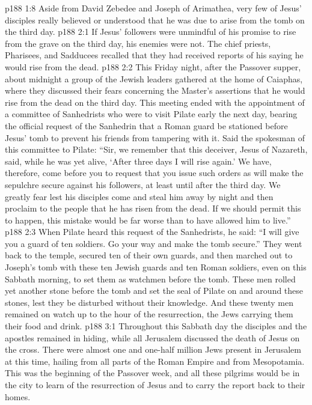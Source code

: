 \vs p188 1:8 Aside from David Zebedee and Joseph of Arimathea, very few of Jesus’ disciples really believed or understood that he was due to arise from the tomb on the third day.
\vs p188 2:1 If Jesus’ followers were unmindful of his promise to rise from the grave on the third day, his enemies were not. The chief priests, Pharisees, and Sadducees recalled that they had received reports of his saying he would rise from the dead.
\vs p188 2:2 This Friday night, after the Passover supper, about midnight a group of the Jewish leaders gathered at the home of Caiaphas, where they discussed their fears concerning the Master’s assertions that he would rise from the dead on the third day. This meeting ended with the appointment of a committee of Sanhedrists who were to visit Pilate early the next day, bearing the official request of the Sanhedrin that a Roman guard be stationed before Jesus’ tomb to prevent his friends from tampering with it. Said the spokesman of this committee to Pilate: “Sir, we remember that this deceiver, Jesus of Nazareth, said, while he was yet alive, ‘After three days I will rise again.’ We have, therefore, come before you to request that you issue such orders as will make the sepulchre secure against his followers, at least until after the third day. We greatly fear lest his disciples come and steal him away by night and then proclaim to the people that he has risen from the dead. If we should permit this to happen, this mistake would be far worse than to have allowed him to live.”
\vs p188 2:3 When Pilate heard this request of the Sanhedrists, he said: “I will give you a guard of ten soldiers. Go your way and make the tomb secure.” They went back to the temple, secured ten of their own guards, and then marched out to Joseph’s tomb with these ten Jewish guards and ten Roman soldiers, even on this Sabbath morning, to set them as watchmen before the tomb. These men rolled yet another stone before the tomb and set the seal of Pilate on and around these stones, lest they be disturbed without their knowledge. And these twenty men remained on watch up to the hour of the resurrection, the Jews carrying them their food and drink.
\vs p188 3:1 Throughout this Sabbath day the disciples and the apostles remained in hiding, while all Jerusalem discussed the death of Jesus on the cross. There were almost one and one\hyp{}half million Jews present in Jerusalem at this time, hailing from all parts of the Roman Empire and from Mesopotamia. This was the beginning of the Passover week, and all these pilgrims would be in the city to learn of the resurrection of Jesus and to carry the report back to their homes.
